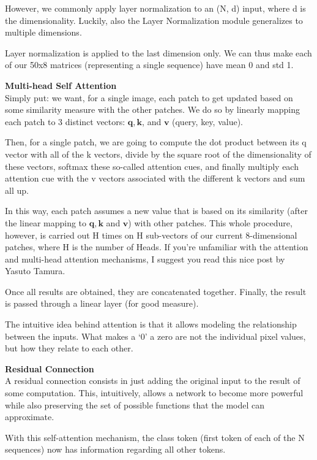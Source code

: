 However, we commonly apply layer normalization to an (N, d) input, where d is the dimensionality. Luckily, also the Layer Normalization module generalizes to multiple dimensions.

Layer normalization is applied to the last dimension only. We can thus make each of our 50x8 matrices (representing a single sequence) have mean 0 and std 1.

\textbf{Multi-head Self Attention} \\
Simply put: we want, for a single image, each patch to get updated based on some similarity measure with the other patches. We do so by linearly mapping each patch to 3 distinct vectors: \(\mathbf{q}, \mathbf{k}\), and \(\mathbf{v}\) (query, key, value).


Then, for a single patch, we are going to compute the dot product between its q vector with all of the k vectors, divide by the square root of the dimensionality of these vectors, softmax these so-called attention cues, and finally multiply each attention cue with the v vectors associated with the different k vectors and sum all up.

In this way, each patch assumes a new value that is based on its similarity (after the linear mapping to \(\mathbf{q}, \mathbf{k}\) and \(\mathbf{v}\)) with other patches. This whole procedure, however, is carried out H times on H sub-vectors of our current 8-dimensional patches, where H is the number of Heads. If you’re unfamiliar with the attention and multi-head attention mechanisms, I suggest you read this nice post by Yasuto Tamura.

Once all results are obtained, they are concatenated together. Finally, the result is passed through a linear layer (for good measure).

The intuitive idea behind attention is that it allows modeling the relationship between the inputs. What makes a ‘0’ a zero are not the individual pixel values, but how they relate to each other.

\textbf{Residual Connection} \\
A residual connection consists in just adding the original input to the result of some computation. This, intuitively, allows a network to become more powerful while also preserving the set of possible functions that the model can approximate.

With this self-attention mechanism, the class token (first token of each of the N sequences) now has information regarding all other tokens.

